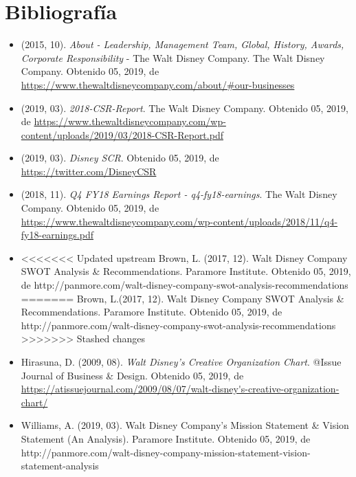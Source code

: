 \section{Bibliografía}

\begin{itemize}

\item
(2015, 10). \textit{About - Leadership, Management Team, Global, History, Awards, Corporate Responsibility} - The Walt Disney Company. The Walt Disney Company. Obtenido 05, 2019, de \url{https://www.thewaltdisneycompany.com/about/#our-businesses}

\item
(2019, 03). \textit{2018-CSR-Report}. The Walt Disney Company. Obtenido 05, 2019, de \url{https://www.thewaltdisneycompany.com/wp-content/uploads/2019/03/2018-CSR-Report.pdf}

\item
(2019, 03). \textit{Disney SCR}. Obtenido 05, 2019, de \url{https://twitter.com/DisneyCSR}

\item
(2018, 11). \textit{Q4 FY18 Earnings Report - q4-fy18-earnings}. The Walt Disney Company. Obtenido 05, 2019, de \url{https://www.thewaltdisneycompany.com/wp-content/uploads/2018/11/q4-fy18-earnings.pdf}

\item
<<<<<<< Updated upstream
Brown, L. (2017, 12). Walt Disney Company SWOT Analysis \& Recommendations. Paramore Institute. Obtenido 05, 2019, de http://panmore.com/walt-disney-company-swot-analysis-recommendations
=======
Brown, L.(2017, 12). Walt Disney Company SWOT Analysis \& Recommendations. Paramore Institute. Obtenido 05, 2019, de http://panmore.com/walt-disney-company-swot-analysis-recommendations
>>>>>>> Stashed changes

\item
Hirasuna, D. (2009, 08). \textit{Walt Disney’s Creative Organization Chart}. @Issue Journal of Business \& Design. Obtenido 05, 2019, de \url{https://atissuejournal.com/2009/08/07/walt-disney's-creative-organization-chart/}

\item
Williams, A. (2019, 03). Walt Disney Company’s Mission Statement \& Vision Statement (An Analysis). Paramore Institute. Obtenido 05, 2019, de http://panmore.com/walt-disney-company-mission-statement-vision-statement-analysis


\end{itemize}